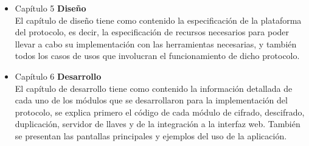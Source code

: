 \begin{itemize}
\item Capítulo 5 \textbf{Diseño} \\
El capítulo de diseño tiene como contenido la especificación de la plataforma del protocolo, es decir, la especificación de recursos necesarios para poder llevar a cabo su implementación con las herramientas necesarias, y también todos los casos de usos que involucran el funcionamiento de dicho protocolo.

\item Capítulo 6 \textbf{Desarrollo} \\
El capítulo de desarrollo tiene como contenido la información detallada de cada uno de los módulos que se desarrollaron para la implementación del protocolo, se explica primero el código de cada módulo de cifrado, descifrado, duplicación, servidor de llaves y de la integración a la interfaz web. También se presentan las pantallas principales y ejemplos del uso de la aplicación.

\end{itemize}






